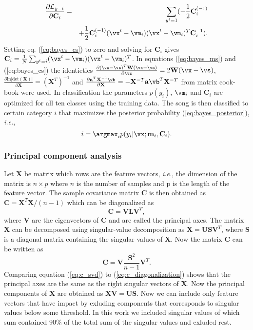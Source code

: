 \documentclass[aps,prb,10pt,twocolumn,groupedaddress]{revtex4-1}
\begin{document}
\begin{eqnarray}
  \frac{\partial{\mathcal{L}_{y=i}}}{\partial\mathbf{C}_i}&=&\sum_{y^t=1}(-\frac{1}{2}\mathbf{C}_i^{(-1)}\nonumber\\
  & &+\frac{1}{2}\mathbf{C}_i^{(-1)}(\vx^t-\vm_i)(\vx^t-\vm_i)^T\mathbf{C}_i^{-1}).
  \label{eq:bayes_cs}
\end{eqnarray}
Setting eq. (\ref{eq:bayes_cs}) to zero and solving for $\mathbf{C}_i$ gives
$\mathbf{C}_i=\frac{1}{N}\sum_{y^t=i}(\vx^t-\vm_i)(\vx^t-\vm_i)^T$. In equations
(\ref{eq:bayes_ms}) and (\ref{eq:bayes_cs}) the identieties
$\frac{\partial(\vx-\vs)^T\mathbf{W}(\vx-\vs)}{\partial\vs} = 2\mathbf{W}(\vx-\vs)$, $\frac{\partial\mathrm{ln}|\mathrm{det}(\mathbf{X})|}{\partial\mathbf{X}}=(\mathbf{X}^T)^{-1}$ and  $\frac{\partial\mathbf{a}^T\mathbf{X}^{-1}\vb}{\partial\mathbf{X}}=-\mathbf{X}^{-T}\mathbf{a}\vb^T\mathbf{X}^{-T}$ from matrix cook-book
\cite{matrixcookbook}
were used. In classification the parameters $p(y_i)$, $\vm_i$ and $\mathbf{C}_i$
are optimized for all ten classes using the training data. The song is then
classified to certain category $i$ that maximizes the posterior probability
(\ref{eq:bayes_posterior}), \textit{i.e.},
\begin{equation}
  i = \argmax_i p(y_i|\vx;\mathbf{m}_{i},\mathbf{C}_{i}).
\end{equation}
\subsubsection{Principal component analysis}
\label{sec:principal_component}
Let $\mathbf{X}$ be matrix which rows are the feature vectors, \textit{i.e.},
the dimension of the matrix is $n\times p$ where $n$ is the number of samples
and p is the length of the feature vector.
The sample covariance matrix $\mathbf{C}$ is then obtained as
$\mathbf{C}=\mathbf{X}^T\mathbf{X}/(n-1)$ which can be diagonalized as
\begin{equation}
  \mathbf{C}=\mathbf{V}\mathbf{L}\mathbf{V}^T,
  \label{eq:c_diagonalization}
\end{equation}
where $\mathbf{V}$ are the eigenvectors of $\mathbf{C}$ and are called
the principal axes.
The matrix $\mathbf{X}$ can be decomposed using singular-value decomposition as
$\mathbf{X}=\mathbf{U}\mathbf{S}\mathbf{V}^T$, where $\mathbf{S}$ is a diagonal
matrix containing the singular values of $\mathbf{X}$. Now the matrix
$\mathbf{C}$ can be written as
\begin{equation}
  \mathbf{C} = \mathbf{V}\frac{\mathbf{S}^2}{n-1}\mathbf{V}^T.
  \label{eq:c_svd}
\end{equation}
Comparing equation (\ref{eq:c_svd}) to (\ref{eq:c_diagonalization}) shows that
the principal axes are the same as the right singular vectors of $\mathbf{X}$.
Now the principal components of $\mathbf{X}$ are obtained as
$\mathbf{X}\mathbf{V}=\mathbf{U}\mathbf{S}$. Now we can include only feature
vectors that have impact by exluding components that corresponds to singular
values below some threshold. In this work we included singular values of which
sum contained 90\% of the total sum of the singular values and exluded rest.
\end{document}
